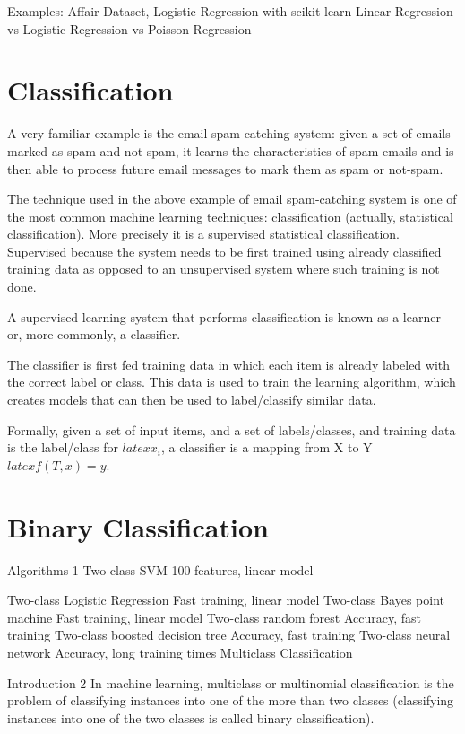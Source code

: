 \noindent Examples: Affair Dataset, Logistic Regression with scikit-learn
Linear Regression vs Logistic Regression vs Poisson Regression

\section{Classification}

A very familiar example is the email spam-catching system: given a set of emails marked as spam and not-spam, it learns the characteristics of spam emails and is then able to process future email messages to mark them as spam or not-spam.

The technique used in the above example of email spam-catching system is one of the most common machine learning techniques: classification (actually, statistical classification). More precisely it is a supervised statistical classification. Supervised because the system needs to be first trained using already classified training data as opposed to an unsupervised system where such training is not done.

A supervised learning system that performs classification is known as a learner or, more commonly, a classifier.

The classifier is first fed training data in which each item is already labeled with the correct label or class. This data is used to train the learning algorithm, which creates models that can then be used to label/classify similar data.

Formally, given a set of input items, and a set of labels/classes, and training data is the label/class for $latex x_i$, a classifier is a mapping from X to Y $latex f(T, x) = y$.

\section{Binary Classification}
Algorithms 1
Two-class SVM
100 features, linear model

Two-class Logistic Regression
Fast training, linear model
Two-class Bayes point machine
Fast training, linear model
Two-class random forest
Accuracy, fast training
Two-class boosted decision tree
Accuracy, fast training
Two-class neural network
Accuracy, long training times
Multiclass Classification


Introduction 2
In machine learning, multiclass or multinomial classification is the problem of classifying instances into one of the more than two classes (classifying instances into one of the two classes is called binary classification).

